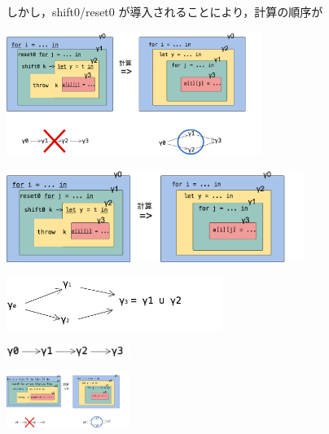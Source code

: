 しかし，shift0/reset0 が導入されることにより，計算の順序が

\begin{center}
  \includegraphics[clip,height=4cm]{./img/ecex_for.png}
\end{center}

\begin{center}
  \includegraphics[clip,height=3cm]{./img/ecex_for_non_gamma.png}
\end{center}

\begin{center}
  \includegraphics[clip,width=7cm]{./img/gamma.png}
\end{center}

\begin{center}
  \includegraphics[clip,width=4cm]{./img/gamma_normal.png}
\end{center}

\begin{center}
  \includegraphics[clip,width=4cm]{./img/ecex_for_aryset.png}
\end{center}

